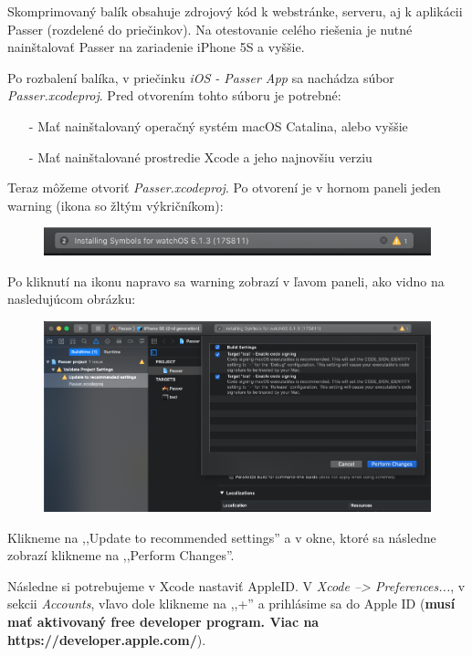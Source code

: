 \indent Skomprimovaný balík obsahuje zdrojový kód k webstránke, serveru, aj k aplikácii Passer (rozdelené do priečinkov). Na otestovanie celého riešenia je nutné nainštalovať Passer na zariadenie iPhone 5S a vyššie.

Po rozbalení balíka, v priečinku \textit{iOS - Passer App} sa nachádza súbor \textit{Passer.xcodeproj}. Pred otvorením tohto súboru je potrebné:
\begin{itemize}
    \item[-] Mať nainštalovaný operačný systém macOS Catalina, alebo vyššie
    \item[-] Mať nainštalované prostredie Xcode a jeho najnovšiu verziu
\end{itemize}

\noindent Teraz môžeme otvoriť \textit{Passer.xcodeproj}. Po otvorení je v hornom paneli jeden warning (ikona so žltým výkričníkom):

\begin{figure}[H]
  \centering
  \includegraphics[width=14cm]{img/tutorial1.png}
  \label{tutorial1}
\end{figure}

\noindent Po kliknutí na ikonu napravo sa warning zobrazí v ľavom paneli, ako vidno na nasledujúcom obrázku: 

\begin{figure}[H]
  \centering
  \includegraphics[width=15cm]{img/tutorial2.png}
  \label{tutorial2}
\end{figure}

\noindent Klikneme na ,,Update to recommended settings'' a v okne, ktoré sa následne zobrazí klikneme na ,,Perform Changes''.

Následne si potrebujeme v Xcode nastaviť AppleID. V \textit{Xcode --> Preferences...}, v sekcii \textit{Accounts}, vľavo dole klikneme na ,,+'' a prihlásime sa do Apple ID (\textbf{musí mať aktivovaný free developer program. Viac na https://developer.apple.com/}).

